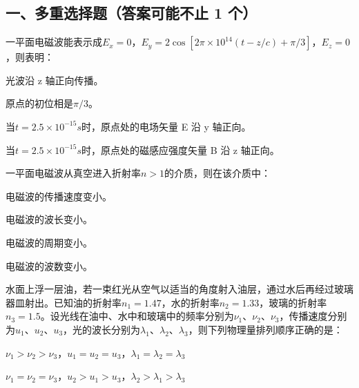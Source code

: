 \documentclass[standard, analysis, notocnum]{ExBook}
\newcommand{\answerarea}[1][8cm]{%
  \par\vspace{2mm}%
  \noindent{\color{themeColor!35}\rule{\linewidth}{0.4pt}}\par
  \noindent\begin{minipage}[t][#1][t]{\linewidth}\vspace{0pt}\end{minipage}\par
  \noindent{\color{themeColor!35}\rule{\linewidth}{0.4pt}}\par
}
\begin{document}
\subsection{一、多重选择题（答案可能不止 1 个）}
\begin{qitems}
\begin{bbox}
\qitem 一平面电磁波能表示成$E_{x}=0$，$E_{y}=2\cos [2\pi \times 10^{14}(t-z/c)+\pi /3]$，$E_{z}=0$，则表明：
\par\noindent\hspace{2em}光波沿 z 轴正向传播。
\par\noindent\hspace{2em}原点的初位相是$\pi /3$。
\par\noindent\hspace{2em}当$t=2.5\times 10^{-15}s$时，原点处的电场矢量 E 沿 y 轴正向。
\par\noindent\hspace{2em}当$t=2.5\times 10^{-15}s$时，原点处的磁感应强度矢量 B 沿 z 轴正向。
\answerarea[3.5cm]
\end{bbox}
\begin{bbox}
\qitem 一平面电磁波从真空进入折射率$n>1$的介质，则在该介质中：
\par\noindent\hspace{2em}电磁波的传播速度变小。
\par\noindent\hspace{2em}电磁波的波长变小。
\par\noindent\hspace{2em}电磁波的周期变小。
\par\noindent\hspace{2em}电磁波的波数变小。
\answerarea[3.5cm]
\end{bbox}
\begin{bbox}
\qitem 水面上浮一层油，若一束红光从空气以适当的角度射入油层，通过水后再经过玻璃器皿射出。已知油的折射率$n_{1}=1.47$，水的折射率$n_{2}=1.33$，玻璃的折射率$n_{3}=1.5$。设光线在油中、水中和玻璃中的频率分别为$\nu_{1}$、$\nu_{2}$、$\nu_{3}$，传播速度分别为$u_{1}$、$u_{2}$、$u_{3}$，光的波长分别为$\lambda_{1}$、$\lambda_{2}$、$\lambda_{3}$，则下列物理量排列顺序正确的是：
\par\noindent\hspace{2em}$\nu_{1}>\nu_{2}>\nu_{3}$，$u_{1}=u_{2}=u_{3}$，$\lambda_{1}=\lambda_{2}=\lambda_{3}$
\par\noindent\hspace{2em}$\nu_{1}=\nu_{2}=\nu_{3}$，$u_{2}>u_{1}>u_{3}$，$\lambda_{2}>\lambda_{1}>\lambda_{3}$

\end{bbox}
\end{qitems}
\end{document}
